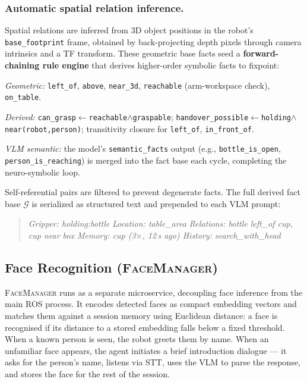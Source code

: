 \documentclass[twocolumn,10pt]{article}
\newcommand{\FM}{\textsc{FaceManager}}
\begin{document}
\subsubsection{Automatic spatial relation inference.}
Spatial relations are inferred from 3D object positions in the robot's
\texttt{base\_footprint} frame, obtained by back-projecting depth pixels
through camera intrinsics and a TF transform.
These geometric base facts seed a \textbf{forward-chaining rule engine}
that derives higher-order symbolic facts to fixpoint:
\begin{compactitem}
  \item \emph{Geometric:} \texttt{left\_of}, \texttt{above}, \texttt{near\_3d},
        \texttt{reachable} (arm-workspace check), \texttt{on\_table}.
  \item \emph{Derived:} \texttt{can\_grasp}$\leftarrow$\texttt{reachable}$\wedge$\texttt{graspable};
        \texttt{handover\_possible}$\leftarrow$\texttt{holding}$\wedge$\texttt{near(robot,person)};
        transitivity closure for \texttt{left\_of}, \texttt{in\_front\_of}.
  \item \emph{VLM semantic:} the model's \texttt{semantic\_facts} output
        (e.g., \texttt{bottle\_is\_open}, \texttt{person\_is\_reaching})
        is merged into the fact base each cycle, completing the neuro-symbolic loop.
\end{compactitem}
Self-referential pairs are filtered to prevent degenerate facts.
The full derived fact base $\mathcal{G}$
is serialized as structured text and prepended to each VLM prompt:
\begin{quote}\small\itshape
Gripper: holding:bottle \textbar{} Location: table\_area \textbar{}
Relations: bottle left\_of cup, cup near box \textbar{}
Memory: cup (3$\times$, 12\,s ago) \textbar{}
History: search\_with\_head\,\checkmark
\end{quote}

\subsection{Face Recognition (\FM)}
\label{sec:face}

\FM{} runs as a separate microservice, decoupling face inference from the
main ROS process.
It encodes detected faces as compact embedding vectors and matches them
against a session memory using Euclidean distance: a face is recognised
if its distance to a stored embedding falls below a fixed threshold.
When a known person is seen, the robot greets them by name.
When an unfamiliar face appears, the agent initiates a brief introduction
dialogue — it asks for the person's name, listens via STT, uses the VLM
to parse the response, and stores the face for the rest of the session.
\end{document}
